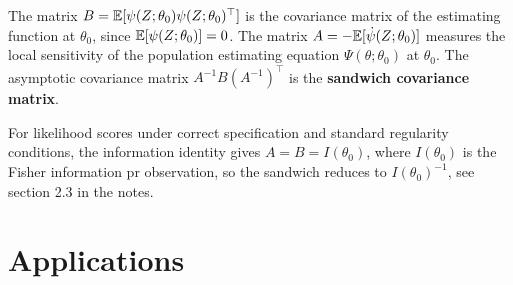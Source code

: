 \begin{remark*}
  The matrix $B = \mathbb{E}[\psi(Z;\theta_0)\psi(Z;\theta_0)^{\top }]$  is the covariance matrix of the
  estimating function at $\theta_0$, since $\mathbb{E}[\psi(Z;\theta_0)] = 0$. The matrix $A =
  -\mathbb{E}[\dot\psi(Z;\theta_0)]$ measures the local sensitivity of the population estimating equation
  $\Psi(\theta;\theta_0)$ at $\theta_0$. The asymptotic covariance matrix $A^{-1}B(A^{-1})^{\top }$
  is the \textbf{sandwich covariance matrix}.

  For likelihood scores under correct specification and standard regularity conditions, the
  information identity gives $A = B = I(\theta_0)$, where $I(\theta_0)$ is the Fisher information pr
  observation, so the sandwich reduces to $I(\theta_0)^{-1}$, see section 2.3 in the notes.
\end{remark*}


\begin{remark*}

\end{remark*}


\section{Applications}
\label{sec:}

